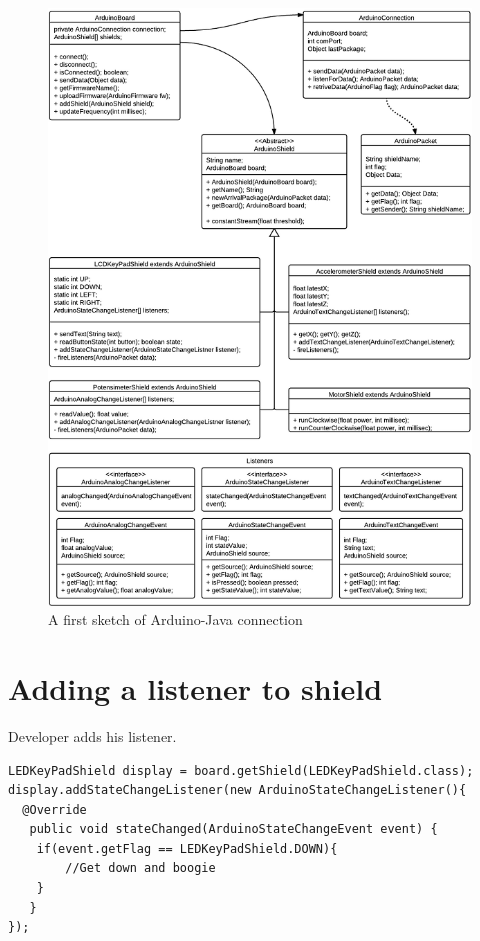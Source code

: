\clearpage

\begin{figure}[hp]
  \includegraphics{./img/architecture-arduinojava.png}
  \caption{A first sketch of Arduino-Java connection}
  \label{fig:architecture-arduinojava}
\end{figure}

\section{Adding a listener to shield}


Developer adds his listener.
\javacode
\begin{lstlisting}
LEDKeyPadShield display = board.getShield(LEDKeyPadShield.class);
display.addStateChangeListener(new ArduinoStateChangeListener(){
  @Override
   public void stateChanged(ArduinoStateChangeEvent event) {
    if(event.getFlag == LEDKeyPadShield.DOWN){
        //Get down and boogie
    }
   }
});
\end{lstlisting}

